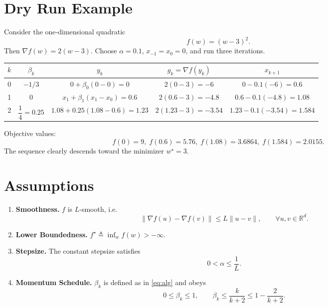 \documentclass{article}
\begin{document}
\section*{Dry Run Example}
Consider the one‑dimensional quadratic
\[
f(w) = (w-3)^2 .
\]
Then $\nabla f(w)=2(w-3)$.  
Choose $\alpha=0.1$, $x_{-1}=x_0=0$, and run three iterations.

\begin{center}
\begin{tabular}{c|c|c|c|c}
$k$ & $\beta_k$ & $y_k$ & $g_k=\nabla f(y_k)$ & $x_{k+1}$\\ \hline
0 & $-1/3$ & $0+\beta_0(0-0)=0$ & $2(0-3)=-6$ & $0-0.1(-6)=0.6$\\[2mm]
1 & $0$ & $x_1+\beta_1(x_1-x_0)=0.6$ & $2(0.6-3)=-4.8$ & $0.6-0.1(-4.8)=1.08$\\[2mm]
2 & $\dfrac{1}{4}=0.25$ & $1.08+0.25(1.08-0.6)=1.23$ &
$2(1.23-3)=-3.54$ & $1.23-0.1(-3.54)=1.584$\\
\end{tabular}
\end{center}
Objective values:
\[
f(0)=9,\; f(0.6)=5.76,\; f(1.08)=3.6864,\; f(1.584)=2.0155.
\]
The sequence clearly descends toward the minimizer $w^\star=3$.

\section*{Assumptions}
\begin{enumerate}[label={A\arabic*}.]
\item \textbf{Smoothness.} $f$ is $L$‑smooth, i.e.
\[
\|\nabla f(u)-\nabla f(v)\|\le L\|u-v\|,\qquad \forall u,v\in\mathbb{R}^d .
\tag{A1}
\]
\item \textbf{Lower Boundedness.} $f^\star\triangleq\inf_{w}f(w)>-\infty$. 
\item \textbf{Stepsize.} The constant stepsize satisfies
\[
0<\alpha\le \frac{1}{L}.
\tag{A3}
\]
\item \textbf{Momentum Schedule.} $\beta_k$ is defined as in \eqref{eq:alg} and obeys
\[
0\le \beta_k\le 1,\qquad \beta_k\le \frac{k}{k+2}\le 1-\frac{2}{k+2}.
\tag{A4}
\]
\end{enumerate}

\end{document}
